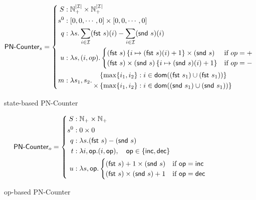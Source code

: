 \begin{figure}[H]
  \[
    \textsf{PN-Counter}_s = \left\{\begin{aligned}
      S &: \mathbb{N}_+^{|\mathcal{I}|} \times \mathbb{N}_+^{|\mathcal{I}|} \\
      s^0 &: \left[ 0, 0, \cdots, 0 \right] \times \left[ 0, 0, \cdots, 0 \right] \\
      q &: \lambda s. \sum_{i \in \mathcal{I}} (\textsf{fst}~s)(i) - \sum_{i \in
        \mathcal{I}} (\textsf{snd}~s)(i) \\
      u &: \lambda s,(i,op). \begin{cases}
             (\textsf{fst}~s)\left\{ i \mapsto (\textsf{fst}~s)(i) + 1 \right\} \times (\textsf{snd}~s) & \text{if $op=+$} \\
             (\textsf{fst}~s) \times (\textsf{snd}~s)\left\{ i \mapsto (\textsf{snd}~s)(i) + 1 \right\} & \text{if $op=-$} \\
           \end{cases} \\
      m &: \lambda s_1, s_2.\, \begin{aligned}
             &\left\{ \max\{ i_1, i_2 \} : i \in \mathsf{dom}((\textsf{fst}~s_1) \cup (\textsf{fst}~s_1)) \right\} \\
             \times &\left\{ \max\{ i_1, i_2 \} : i \in \mathsf{dom}((\textsf{snd}~s_1) \cup (\textsf{snd}~s_1)) \right\}
           \end{aligned}
    \end{aligned}\right.
  \]
  \caption{state-based \textsf{PN-Counter} \CRDT}
\end{figure}

\begin{figure}[H]
  \centering
  \[
    \textsf{PN-Counter}_o = \left\{\begin{aligned}
      S &: \mathbb{N}_+ \times \mathbb{N}_+  \\
      s^0 &: 0 \times 0 \\
      q &: \lambda s. (\textsf{fst}~s) - (\textsf{snd}~s) \\
      t &: \lambda i, \mathsf{op}. (i, \mathsf{op}),\quad \mathsf{op} \in \{
        \mathsf{inc}, \mathsf{dec} \} \\
      u &: \lambda s,\mathsf{op}. \begin{cases}
             (\textsf{fst}~s) + 1 \times (\textsf{snd}~s) & \text{if $\mathsf{op} = \mathsf{inc}$} \\
             (\textsf{fst}~s) \times (\textsf{snd}~s) + 1 & \text{if $\mathsf{op} = \mathsf{dec}$} \\
           \end{cases} \\
    \end{aligned}\right.
  \]
  \caption{op-based \textsf{PN-Counter} \CRDT}
\end{figure}

